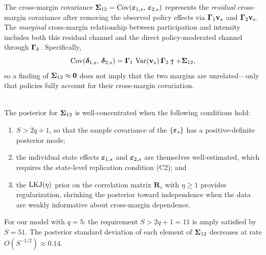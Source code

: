 \begin{remark}
\label{smb:rem-sigma12-residual}
  The cross-margin covariance
  $\boldsymbol{\Sigma}_{12} = \operatorname*{Cov}(\boldsymbol{\varepsilon}_{1,s},\, \boldsymbol{\varepsilon}_{2,s})$ represents
  the \emph{residual} cross-margin covariance after removing the
  observed policy effects via $\boldsymbol{\Gamma}_1\mathbf{v}_s$ and $\boldsymbol{\Gamma}_2\mathbf{v}_s$.
  The \emph{marginal} cross-margin relationship between participation
  and intensity includes both this residual channel and the direct
  policy-moderated channel through $\boldsymbol{\Gamma}_k$. Specifically,
  \[
    \operatorname*{Cov}(\boldsymbol{\delta}_{1,s},\, \boldsymbol{\delta}_{2,s})
    = \boldsymbol{\Gamma}_1\,\operatorname*{Var}(\mathbf{v}_s)\,\boldsymbol{\Gamma}_2\intercal + \boldsymbol{\Sigma}_{12},
  \]
  so a finding of $\boldsymbol{\Sigma}_{12} \approx \mathbf{0}$ does not imply
  that the two margins are unrelated---only that policies fully account
  for their cross-margin covariation.
\end{remark}


\begin{proposition}\label{smb:prop-sigma12-wellconc}
  \leavevmode\\
  The posterior for $\boldsymbol{\Sigma}_{12}$ is well-concentrated when the
  following conditions hold:
  \begin{enumerate}[label=\textup{(\roman*)}]
    \item $S > 2q + 1$, so that the sample covariance of the
      $\{\boldsymbol{\varepsilon}_s\}$ has a positive-definite posterior mode;
    \item the individual state effects $\boldsymbol{\varepsilon}_{1,s}$ and
      $\boldsymbol{\varepsilon}_{2,s}$ are themselves well-estimated, which requires the
      state-level replication condition\/ \textup{(C2)}; and
    \item the $\operatorname{LKJ}(\eta)$ prior
      \citep{LewandowskiEtAl2009} on the correlation matrix
      $\mathbf{R}_\varepsilon$ with $\eta \ge 1$ provides
      regularization, shrinking the posterior toward independence when the
      data are weakly informative about cross-margin dependence.
  \end{enumerate}
  For our model with $q = 5$: the requirement $S > 2q + 1 = 11$ is
  amply satisfied by $S = 51$. The posterior standard deviation of each
  element of $\boldsymbol{\Sigma}_{12}$ decreases at rate $O(S^{-1/2}) \approx 0.14$.
\end{proposition}

